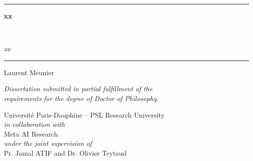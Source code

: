 
\begin{titlepage}

	\begin{center}
    \textcolor{PSLBlue}{\hrule}
    \vskip 0.8cm
        \begin{center}
            \begin{Huge}
                \textcolor{PSLBlue}{\textbf{xx}}
            \end{Huge}\\[10pt]
            \begin{LARGE}
                \textcolor{PSLBlue}{\emph{xx}}
            \end{LARGE}
        \end{center}
    \vskip 0.1cm
    \textcolor{PSLBlue}{\hrule}
    \vskip 1cm
        \begin{Large}
        Laurent Meunier
        \end{Large}
		\vfill
	    \begin{Large}	
   	     \emph{Dissertation submitted in partial fulfillment of the \\ requirements for the degree of Doctor of Philosophy.}
        \end{Large}
                 
    	\vfill
    	
	\begin{Large}
	   Universit\'e Paris-Dauphine -- PSL Research University \\[0.5cm] 
	   \emph{in collaboration with} \\[0.5cm] 
	   Meta AI Research \\[0.5cm] 
	   \emph{under the joint supervision of} \\[0.5cm]
                    
        Pr. Jamal ATIF and Dr. Olivier Teytaud
	\end{Large}
\end{center}

\newpage
\null
\thispagestyle{empty}
\newpage

\end{titlepage}






